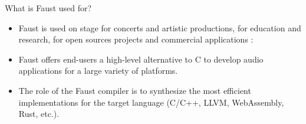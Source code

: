 
\begin{frame}[fragile]{What is Faust used for?}
	\begin{itemize}
		
		\item Faust is used on stage for concerts and artistic productions, for education and research, for open sources projects and commercial applications :
		
		\item Faust offers end-users a high-level alternative to C to develop audio applications for a large variety of platforms.
		
		\item The role of the Faust compiler is to synthesize the most efficient implementations for the target language (C/C++, LLVM, WebAssembly, Rust, etc.).
	\end{itemize}
	
\end{frame}
